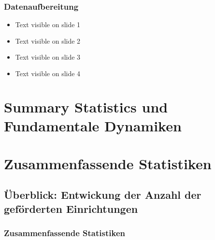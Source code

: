 \begin{frame}[fragile]
\frametitle{Datenaufbereitung}

\begin{itemize}
 \item<1-> Text visible on slide 1
 \item<2-> Text visible on slide 2
 \item<3> Text visible on slide 3
 \item<4-> Text visible on slide 4
\end{itemize}

\end{frame}



\section{Summary Statistics und Fundamentale Dynamiken}


\section{Zusammenfassende Statistiken}

\subsection{Überblick: Entwickung der Anzahl der geförderten Einrichtungen}


\begin{frame}[fragile]
\frametitle{Zusammenfassende Statistiken}
\begin{table}[ht]
\centering
{}
\caption{Summary Statistics} 
\label{fundamentalDynamics}
\end{table}

\end{frame}

